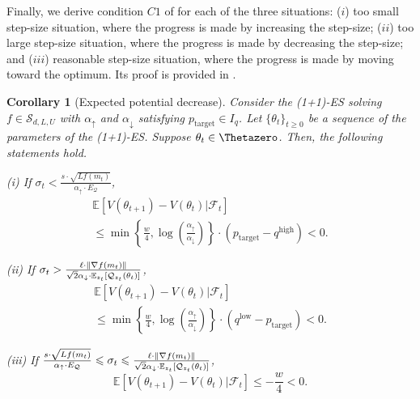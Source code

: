 \documentclass[journal]{IEEEtran}
\providecommand{\E}{\mathbb{E}} %
\renewcommand{\geq}{\geqslant} %
\renewcommand{\leq}{\leqslant} %
\DeclarePairedDelimiter{\norm}{\lVert}{\rVert}
\newtheorem{corollary}[theorem]{Corollary}
\theoremstyle{definition}
\newcommand{\aup}{\alpha_{\uparrow}}
\newcommand{\adown}{\alpha_{\downarrow}}
\begin{document}
Finally, we derive condition $C1$ of  for each of the three situations: ($i$) too small step-size situation, where the progress is made by increasing the step-size; ($ii$) too large step-size situation, where the progress is made by decreasing the step-size; and ($iii$) reasonable step-size situation, where the progress is made by moving toward the optimum.
Its proof is provided in .
\begin{corollary}[Expected potential decrease]\label{cor:expected_potential_decrease}
Consider the (1+1)-ES solving $f \in \mathcal{S}_{d,L,U}$ with $\aup$ and $\adown$ satisfying $p_\mathrm{target} \in I_q$. Let $\{\theta_t\}_{t\geq 0}$ be a sequence of the parameters of the (1+1)-ES.
Suppose $\theta_t \in\Thetazero$. 
Then, the following statements hold.

(i) If $\sigma_t < \frac{s \cdot \sqrt{ L f(m_t) }}{ \aup\cdot E_\mathcal{Q}}$,
\begin{multline}
\E\left[V(\theta_{t+1}) - V(\theta_t) |\mathcal{F}_t\right]
\\
\leq
\min
\left\{
    \frac{w}{4}, \log\left(\frac{\aup}{\adown}\right)
\right\}
\cdot
    (p_\mathrm{target} - q^\mathrm{high})
<0
.
\label{eq:small_sigma_expected_potential_decrease}
\end{multline}

(ii) If $\sigma_t > \frac{\ell \cdot \norm{\nabla f(m_t)} }{ \sqrt{2}\adown\cdot \E_{z_t}[\mathcal{Q}_{z_t}(\theta_t)]}$,
\begin{multline}
\E\left[V(\theta_{t+1}) - V(\theta_t) |\mathcal{F}_t\right]
\\
\leq
\min
\left\{
    \frac{w}{4}, \log\left(\frac{\aup}{\adown}\right)
\right\}
\cdot
    (q^\mathrm{low} - p_\mathrm{target})
<0
.
\label{eq:large_sigma_expected_potential_decrease}
\end{multline}

(iii) If  $ \frac{s \cdot \sqrt{ L f(m_t) }}{ \aup\cdot E_\mathcal{Q}} \leq \sigma_t \leq \frac{\ell \cdot \norm{\nabla f(m_t)} }{ \sqrt{2}\adown\cdot \E_{z_t}[\mathcal{Q}_{z_t}(\theta_t)]}$,
\begin{equation}
\E\left[V(\theta_{t+1}) - V(\theta_t) |\mathcal{F}_t\right]
\leq -\frac{w}{4} 
<0
.
\label{eq:reasonable_sigma_expected_potential_decrease}
\end{equation}
\end{corollary}
\end{document}
